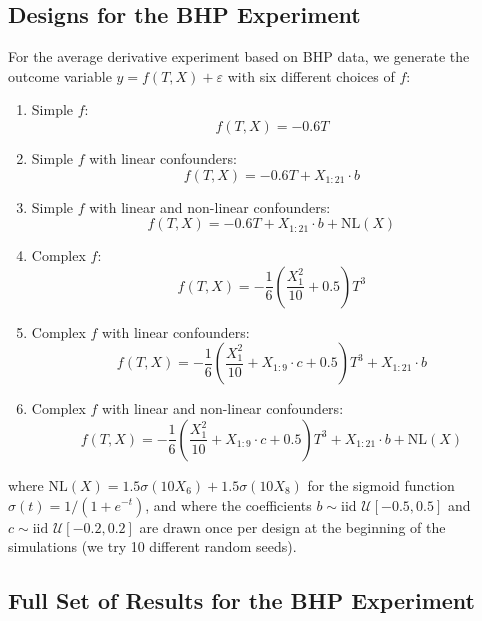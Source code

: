 \documentclass[nohyperref]{article}
\theoremstyle{plain}
\theoremstyle{definition}
\theoremstyle{remark}
\begin{document}
\subsection{Designs for the BHP Experiment}\label{sec:designs}
For the average derivative experiment based on BHP data, we generate the outcome variable $y = f(T,X) + \varepsilon$ with six different choices of $f$:
\begin{enumerate}
    \item Simple $f$: $$f(T, X) = -0.6T$$
    \item Simple $f$ with linear confounders: $$f(T, X) = -0.6T + X_{1:21} \cdot b$$
    \item Simple  $f$ with linear and non-linear confounders: $$f(T, X) = -0.6T + X_{1:21} \cdot b + \mathrm{NL}(X)$$
    \item Complex $f$: $$f(T, X) = -\frac{1}{6} \left(\frac{X_1^2}{10} + 0.5\right) T^3$$
    \item Complex $f$ with linear confounders: $$f(T, X) = -\frac{1}{6}\left(\frac{X_1^2}{10} + X_{1:9} \cdot c + 0.5\right) T^3 + X_{1:21} \cdot b$$
    \item Complex  $f$ with linear and non-linear confounders: $$f(T, X) = -\frac{1}{6}\left(\frac{X_1^2}{10} + X_{1:9} \cdot c + 0.5\right) T^3 + X_{1:21} \cdot b + \mathrm{NL}(X)$$
\end{enumerate} where $\mathrm{NL}(X) = 1.5 \sigma(10X_6) + 1.5 \sigma(10X_8)$ for the sigmoid function $\sigma(t) = 1/(1 + e^{-t})$, and where the coefficients $b \sim \text{iid } \mathcal{U}[-0.5, 0.5]$ and $c \sim \text{iid } \mathcal{U}[-0.2, 0.2]$ are drawn once per design at the beginning of the simulations (we try 10 different random seeds).

\clearpage
\subsection{Full Set of Results for the BHP Experiment}
\begin{table}[!htbp]
    \centering
    \caption{RieszNet: Regression and Riesz representer $R^2$, bias, RMSE and coverage over 1000 semi-synthetic datasets based on the BHP gasoline price data (10 different random seeds).}\label{tab:BHP_NN}
    \vspace{1em}
    
\end{table}

\begin{table}[!htbp]
    \centering
    \caption{ForestRiesz: Regression and Riesz representer $R^2$, bias, RMSE and coverage over 1000 semi-synthetic datasets based on the BHP gasoline price data (10 different random seeds).}\label{tab:BHP_RF}
    \vspace{1em}
    \resizebox{\textwidth}{!}{}
\end{table}
\end{document}
